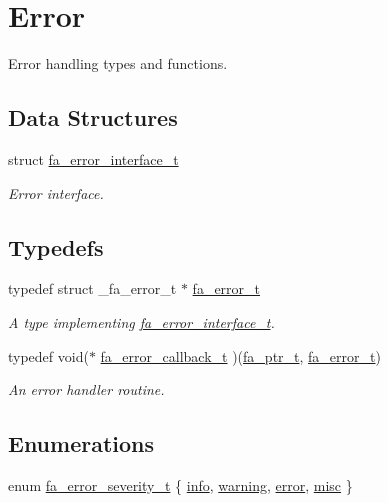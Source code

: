 \hypertarget{group___fa_error}{\section{Error}
\label{group___fa_error}
}


Error handling types and functions.  


\subsection*{Data Structures}
\begin{DoxyCompactItemize}
\item 
struct \hyperlink{structfa__error__interface__t}{fa\-\_\-error\-\_\-interface\-\_\-t}
\begin{DoxyCompactList}\small\item\em Error interface. \end{DoxyCompactList}\end{DoxyCompactItemize}
\subsection*{Typedefs}
\begin{DoxyCompactItemize}
\item 
typedef struct \-\_\-fa\-\_\-error\-\_\-t $\ast$ \hyperlink{group___fa_error_ga4a4feb4d3686657ac8dbd2be421cbb15}{fa\-\_\-error\-\_\-t}
\begin{DoxyCompactList}\small\item\em A type implementing \hyperlink{structfa__error__interface__t}{fa\-\_\-error\-\_\-interface\-\_\-t}. \end{DoxyCompactList}\item 
typedef void($\ast$ \hyperlink{group___fa_error_ga43d8d45a005130a5052ba3281a8bf33e}{fa\-\_\-error\-\_\-callback\-\_\-t} )(\hyperlink{group___fa_ga915ddeae99ad7568b273d2b876425197}{fa\-\_\-ptr\-\_\-t}, \hyperlink{group___fa_error_ga4a4feb4d3686657ac8dbd2be421cbb15}{fa\-\_\-error\-\_\-t})
\begin{DoxyCompactList}\small\item\em An error handler routine. \end{DoxyCompactList}\end{DoxyCompactItemize}
\subsection*{Enumerations}
\begin{DoxyCompactItemize}
\item 
enum \hyperlink{group___fa_error_ga5cf5c13f1e12ae6b125c0265f59f4d82}{fa\-\_\-error\-\_\-severity\-\_\-t} \{ \hyperlink{group___fa_error_gga5cf5c13f1e12ae6b125c0265f59f4d82aa4abb266e72efba828327b605b2ab0f4}{info}, 
\hyperlink{group___fa_error_gga5cf5c13f1e12ae6b125c0265f59f4d82a8de9aef05fc85e519a0cfce33573f492}{warning}, 
\hyperlink{group___fa_error_gga5cf5c13f1e12ae6b125c0265f59f4d82ad606e435413ea0944dd00d49e901e4ed}{error}, 
\hyperlink{group___fa_error_gga5cf5c13f1e12ae6b125c0265f59f4d82a8e61437747405a9d1a65e5020e375e08}{misc}
 \}
\end{DoxyCompactItemize}
